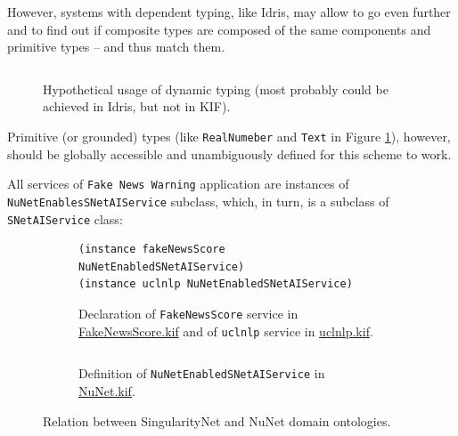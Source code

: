 \documentclass[]{report}
\begin{document}
However, systems with dependent typing, like Idris, may allow to go even further
and to find out if composite types are composed of the same components and
primitive types -- and thus match them.

\begin{figure}[H]
  \captionsetup{width=0.8\linewidth}
  \inputminted[firstline=7, lastline=26, linenos,tabsize=2,breaklines, fontsize=\small]{scm}{../../../ontology/uclnlpDynamic.kif}
  \vspace{-0.3cm}
  \caption{\label{fig:uclnlpDynamicTwo}Hypothetical usage of dynamic typing
  (most probably could be achieved in Idris, but not in KIF).}
\end{figure}

Primitive (or grounded) types (like \texttt{RealNumeber} and \texttt{Text} in
Figure \ref{fig:uclnlpDynamicTwo}), however, should be globally accessible and
unambiguously defined for this scheme to work.

All services of \texttt{Fake News Warning} application are instances of
\texttt{NuNetEnablesSNetAIService} subclass, which, in turn, is a subclass of
\texttt{SNetAIService} class:
\begin{figure}[H]
  \begin{subfigure}[t]{1\textwidth}
    \centering
    \begin{verbatim}
(instance fakeNewsScore NuNetEnabledSNetAIService)
(instance uclnlp NuNetEnabledSNetAIService)
    \end{verbatim}
    \vspace{-0.3cm}
    \captionsetup{width=0.8\linewidth}
    \caption{Declaration of \texttt{FakeNewsScore} service in
    \href{https://github.com/singnet/ai-dsl/blob/master/ontology/
    FakeNewsScore.kif}{FakeNewsScore.kif} and of \texttt{uclnlp} service
    in \href{https://github.com/singnet/ai-dsl/blob/master/ontology/uclnlp.kif}{uclnlp.kif}.}
    \vspace{0.3cm}
  \end{subfigure}
  \begin{subfigure}[t]{1\textwidth}
    \centering
    \inputminted[firstline=1, lastline=2, linenos,tabsize=2,breaklines, fontsize=\small]{scm}{../../../ontology/NuNet.kif}
    \vspace{-0.3cm}
    \captionsetup{width=0.8\linewidth}
    \caption{Definition of \texttt{NuNetEnabledSNetAIService} in \href{https://github.com/singnet/ai-dsl/blob/master/ontology/NuNet.kif}{NuNet.kif}.}
  \end{subfigure}
  \captionsetup{width=0.9\linewidth}
  \caption{Relation between SingularityNet and NuNet domain ontologies.}
  \label{fig:SNET_and_NuNet}
\end{figure}
\end{document}
